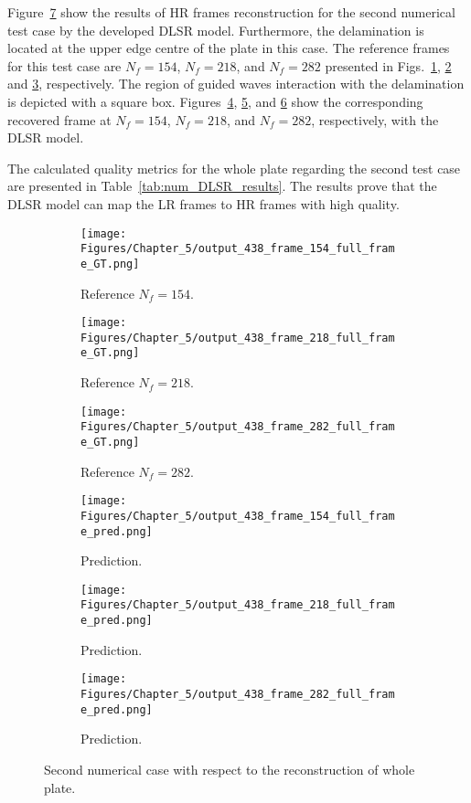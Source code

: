 Figure~\ref{fig:num_results_CS_438} show the results of HR frames reconstruction for the second numerical test case by the developed DLSR model.
Furthermore, the delamination is located at the upper edge centre of the plate in this case.
The reference frames for this test case are $N_f=154$, $N_f=218$, and $N_f=282$ presented in Figs.~\ref{fig:ref_438_full_154}, \ref{fig:ref_438_full_218} and \ref{fig:ref_438_full_282}, respectively.
The region of guided waves interaction with the delamination is depicted with a square box.
Figures~\ref{fig:pred_438_full_154}, \ref{fig:pred_438_full_218}, and \ref{fig:pred_438_full_282} show the corresponding recovered frame at $N_f=154$, $N_f=218$, and $N_f=282$, respectively, with the DLSR model.

The calculated quality metrics for the whole plate regarding the second test case are presented in Table~\ref{tab:num_DLSR_results}.
The results prove that the DLSR model can map the LR frames to HR frames with high quality.
\begin{figure} [!ht]
	\centering
	\begin{subfigure}[b]{.32\textwidth}
		\centering
		\texttt{[image: Figures/Chapter\_5/output\_438\_frame\_154\_full\_frame\_GT.png]}
		\caption{Reference $N_f=154$.}
		\label{fig:ref_438_full_154}
	\end{subfigure}
	\begin{subfigure}[b]{.32\textwidth}
		\centering
		\texttt{[image: Figures/Chapter\_5/output\_438\_frame\_218\_full\_frame\_GT.png]}
		\caption{Reference $N_f=218$.}
		\label{fig:ref_438_full_218}
	\end{subfigure}
	\begin{subfigure}[b]{.32\textwidth}
		\centering
		\texttt{[image: Figures/Chapter\_5/output\_438\_frame\_282\_full\_frame\_GT.png]}
		\caption{Reference $N_f=282$.}
		\label{fig:ref_438_full_282}	
	\end{subfigure}
	\begin{subfigure}[b]{.32\textwidth}
		\centering
		\texttt{[image: Figures/Chapter\_5/output\_438\_frame\_154\_full\_frame\_pred.png]}
		\caption{Prediction.}
		\label{fig:pred_438_full_154}
	\end{subfigure}
	\begin{subfigure}[b]{.32\textwidth}
		\centering
		\texttt{[image: Figures/Chapter\_5/output\_438\_frame\_218\_full\_frame\_pred.png]}
		\caption{Prediction.}
		\label{fig:pred_438_full_218}
	\end{subfigure}
	\begin{subfigure}[b]{.32\textwidth}
		\centering
		\texttt{[image: Figures/Chapter\_5/output\_438\_frame\_282\_full\_frame\_pred.png]}
		\caption{Prediction.}
		\label{fig:pred_438_full_282}	
	\end{subfigure}
	\caption{Second numerical case with respect to the reconstruction of whole plate.}
	\label{fig:num_results_CS_438}
\end{figure}

